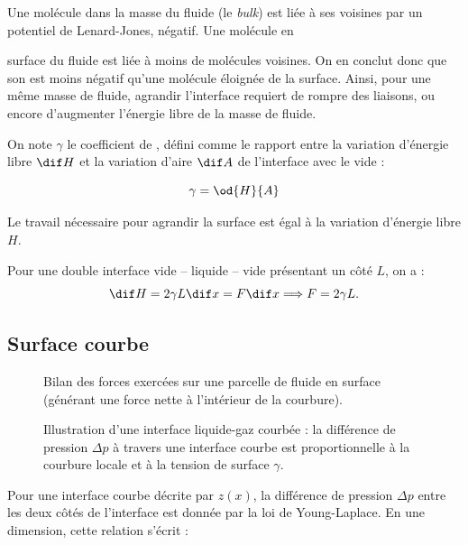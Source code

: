 Une molécule dans la masse du fluide (le \emph{bulk}) est liée à ses voisines par un potentiel de Lenard-Jones, négatif. Une molécule en {surface du fluide est liée à moins de molécules voisines. On en conclut donc que son  est moins négatif qu'une molécule éloignée de la surface. Ainsi, pour une même masse de fluide, agrandir l'interface requiert de rompre des liaisons, ou encore d'augmenter l'énergie libre de la masse de fluide.

On note $\gamma$ le coefficient de , défini comme le rapport entre la variation d’énergie libre $\dif H$ et la variation d’aire $\dif A$ de l’interface avec le vide :

\begin{displaymath}
  \gamma = \od{H}{A}
\end{displaymath}

Le travail nécessaire pour agrandir la surface est égal à la variation d’énergie libre $H$.

Pour une double interface vide -- liquide -- vide présentant un côté $L$, on a :
\begin{displaymath}
  \dif H = 2 \gamma L \dif x = F \dif x \Longrightarrow  F = 2 \gamma L.
\end{displaymath}

\subsection{Surface courbe}
\begin{figure}
  \begin{center}
    
  \end{center}
  \caption{Bilan des forces exercées sur une parcelle de fluide en surface (générant une force nette à l'intérieur de la courbure).}\label{fig:07_tension_1}
\end{figure}

\begin{figure}
  \begin{center}
    
  \end{center}
  \caption{Illustration d'une interface liquide-gaz courbée : la différence de pression $\Delta p$ à travers une interface courbe est proportionnelle à la courbure locale et à la tension de surface $\gamma$.}\label{fig:08_Young_Laplace}
\end{figure}

Pour une interface courbe décrite par $z(x)$, la différence de pression $\Delta p$ entre les deux côtés de l’interface est donnée par la loi de Young-Laplace. En une dimension, cette relation s’écrit :

}
